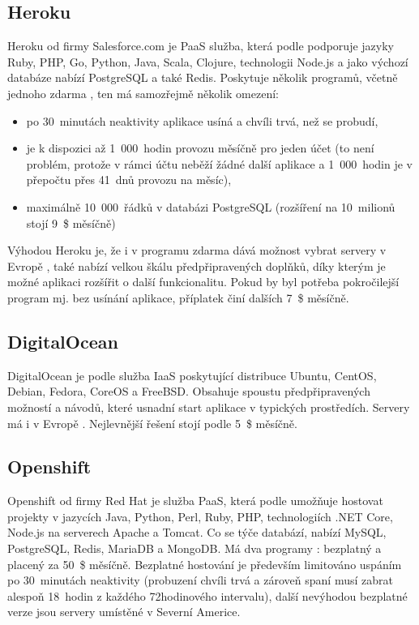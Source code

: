         \subsection{Heroku}\label{heroku}
        Heroku od firmy Salesforce.com je PaaS služba, která podle \cite{heroku1} podporuje jazyky Ruby, PHP, Go, Python, Java, Scala, Clojure, technologii Node.js a jako výchozí databáze nabízí PostgreSQL a také Redis. Poskytuje několik programů, včetně jednoho zdarma \cite{heroku2}, ten má samozřejmě několik omezení:
            \begin{itemize}
                \item po 30~minutách neaktivity aplikace usíná a chvíli trvá, než se probudí,
                \item je k dispozici až 1~000~hodin provozu měsíčně pro jeden účet (to není problém, protože v rámci účtu neběží žádné další aplikace a 1~000~hodin je v přepočtu přes 41~dnů provozu na měsíc),
                \item maximálně 10~000~řádků v databázi PostgreSQL (rozšíření na 10~milionů stojí 9~\$ měsíčně)
            \end{itemize}
        Výhodou Heroku je, že i v programu zdarma dává možnost vybrat servery v Evropě \cite{heroku3}, také nabízí velkou škálu předpřipravených doplňků, díky kterým je možné aplikaci rozšířit o další funkcionalitu. Pokud by byl potřeba pokročilejší program mj. bez usínání aplikace, příplatek činí dalších 7~\$ měsíčně.
        
        \subsection{DigitalOcean}
        DigitalOcean je podle \cite{digitalocean1} služba IaaS poskytující distribuce Ubuntu, CentOS, Debian, Fedora, CoreOS a FreeBSD. Obsahuje spoustu předpřipravených možností a návodů, které usnadní start aplikace v typických prostředích. Servery má i v Evropě \cite{digitalocean2}. Nejlevnější řešení stojí podle \cite{digitalocean3} 5~\$ měsíčně.
        
        \subsection{Openshift}
        Openshift od firmy Red Hat je služba PaaS, která podle \cite{openshift1} umožňuje hostovat projekty v jazycích Java, Python, Perl, Ruby, PHP, technologiích .NET Core, Node.js na serverech Apache a Tomcat. Co se týče databází, nabízí MySQL, PostgreSQL, Redis, MariaDB a MongoDB. Má dva programy \cite{openshift2}: bezplatný a placený za 50~\$ měsíčně. Bezplatné hostování je především limitováno uspáním po 30~minutách neaktivity (probuzení chvíli trvá a zároveň spaní musí zabrat alespoň 18~hodin z každého 72hodinového intervalu), další nevýhodou bezplatné verze jsou servery umístěné v Severní Americe.
        
